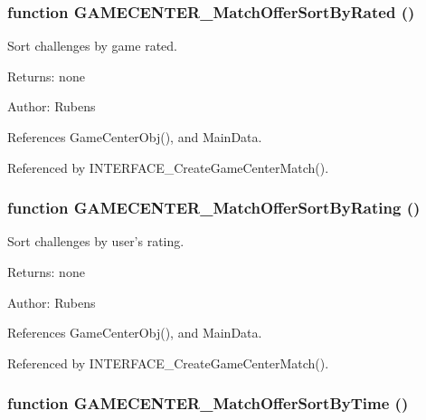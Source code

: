 \subsubsection[GAMECENTER\_\-MatchOfferSortByRated]{\setlength{\rightskip}{0pt plus 5cm}function GAMECENTER\_\-MatchOfferSortByRated ()}\label{gamecenter_2gamecenter_8js_62aba067adff3d0a124983a6cd308515}


Sort challenges by game rated. 

\begin{Desc}
\item[Returns:]none \end{Desc}
\begin{Desc}
\item[Author:]Rubens \end{Desc}


References GameCenterObj(), and MainData.

Referenced by INTERFACE\_\-CreateGameCenterMatch().
\subsubsection[GAMECENTER\_\-MatchOfferSortByRating]{\setlength{\rightskip}{0pt plus 5cm}function GAMECENTER\_\-MatchOfferSortByRating ()}\label{gamecenter_2gamecenter_8js_e2b1e3118f0b18a81383895a1a24c27f}


Sort challenges by user's rating. 

\begin{Desc}
\item[Returns:]none \end{Desc}
\begin{Desc}
\item[Author:]Rubens \end{Desc}


References GameCenterObj(), and MainData.

Referenced by INTERFACE\_\-CreateGameCenterMatch().
\subsubsection[GAMECENTER\_\-MatchOfferSortByTime]{\setlength{\rightskip}{0pt plus 5cm}function GAMECENTER\_\-MatchOfferSortByTime ()}\label{gamecenter_2gamecenter_8js_a5fbe6b9fc5e30346fde175adbac6461}


